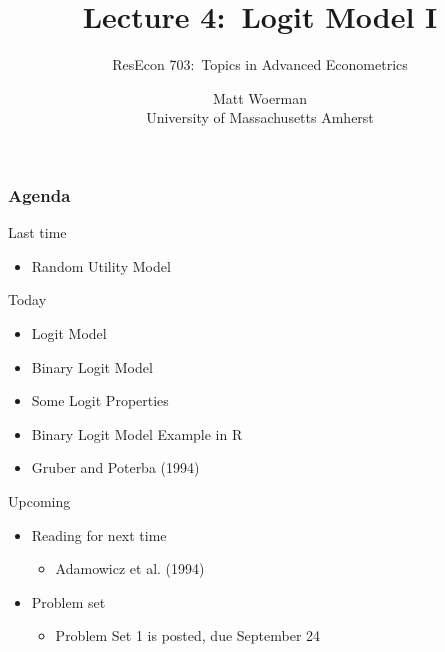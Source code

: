 \documentclass{beamer}
\title[Lecture 4:\ Logit Model I]{Lecture 4:\ Logit Model I}
\author[ResEcon 703:\ Advanced Econometrics]{ResEcon 703:\ Topics in Advanced Econometrics}
\date{Matt Woerman\\University of Massachusetts Amherst}
\begin{document}
{ 
\begin{frame}[noframenumbering]
    \titlepage
\end{frame}
}

\begin{frame}\frametitle{Agenda}
    Last time
    \begin{itemize}
        \item Random Utility Model
    \end{itemize}
    \vspace{2ex}
    Today
    \begin{itemize}
    	\item Logit Model
    	\item Binary Logit Model
    	\item Some Logit Properties
    	\item Binary Logit Model Example in R
    	\item Gruber and Poterba (1994)
    \end{itemize}
    \vspace{2ex}
    Upcoming
    \begin{itemize}
        \item Reading for next time
        \begin{itemize}
            \item Adamowicz et al. (1994)
        \end{itemize}
        \item Problem set
        \begin{itemize}
            \item Problem Set 1 is posted, due September 24
        \end{itemize}
    \end{itemize}
\end{frame}
\end{document}
